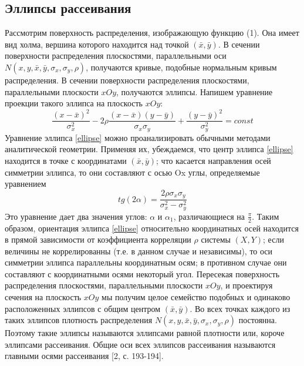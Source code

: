 \documentclass[a4paper]{article}
\begin{document}
        \subsection{Эллипсы рассеивания}
            \noindent Рассмотрим поверхность распределения, изображающую функцию (1). Она имеет вид холма, вершина которого находится над точкой $(\bar{x},\bar{y})$.
            \newline
            В сечении поверхности распределения плоскостями, параллельными оси $ N(x, y, \bar{x}, \bar{y}, \sigma_{x}, \sigma_{y}, \rho)$, получаются кривые, подобные нормальным кривым распределения. В сечении поверхности распределения плоскостями, параллельными плоскости $xOy$, получаются эллипсы. Напишем уравнение проекции такого эллипса на плоскость $xOy$:
            \begin{equation}
                \frac{(x-\bar{x})^{2}}{\sigma_{x}^{2}} -
                2\rho\frac{(x-\bar{x})(y-\bar{y})}{\sigma_{x}\sigma_{y}}+
                \frac{(y-\bar{y})^{2}}{\sigma_{y}^{2}} = const
                \label{ellipse}
            \end{equation}
            Уравнение эллипса \ref{ellipse} можно проанализировать обычными методами аналитической геометрии. Применяя их, убеждаемся, что центр эллипса \ref{ellipse} находится в точке с координатами $(\bar{x},\bar{y})$; что касается направления осей симметрии эллипса, то они составляют с осью Ox углы, определяемые уравнением
            \begin{equation}
                tg(2\alpha) = \frac{2\rho\sigma_{x}\sigma_{y}}{\sigma_{x}^{2} - \sigma_{y}^{2}}
                \label{angle}
            \end{equation}
            Это уравнение дает два значения углов: $\alpha$ и $\alpha_{1}$, различающиеся на $\frac{\pi}{2}$.
            \newline
            Таким образом, ориентация эллипса \ref{ellipse} относительно координатных осей находится в прямой зависимости от коэффициента корреляции $\rho$ системы $(X,Y)$; если величины не коррелированны (т.е. в данном случае и независимы), то оси симметрии эллипса параллельны координатным осям; в противном случае они составляют с координатными осями некоторый угол.
            \newline
            Пересекая поверхность распределения плоскостями, параллельными плоскости $xOy$, и проектируя сечения на плоскость $xOy$ мы получим целое семейство подобных и одинаково расположенных эллипсов с общим центром $(\bar{x},\bar{y})$. Во всех точках каждого из таких эллипсов плотность распределения $ N(x, y, \bar{x}, \bar{y}, \sigma_{x}, \sigma_{y}, \rho)$ постоянна. Поэтому такие эллипсы называются эллипсами равной плотности или, короче эллипсами рассеивания. Общие оси всех эллипсов рассеивания называются главными осями рассеивания [2, с. 193-194].
\end{document}
